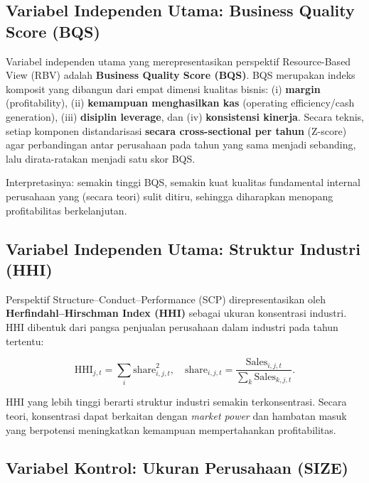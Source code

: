 \documentclass[12pt,a4paper]{report}
\begin{document}
\hypertarget{variabel-independen-utama-business-quality-score-bqs}{%
\subsection{Variabel Independen Utama: Business Quality Score
(BQS)}\label{variabel-independen-utama-business-quality-score-bqs}}

Variabel independen utama yang merepresentasikan perspektif
Resource-Based View (RBV) adalah \textbf{Business Quality Score (BQS)}.
BQS merupakan indeks komposit yang dibangun dari empat dimensi kualitas
bisnis: (i) \textbf{margin} (profitability), (ii) \textbf{kemampuan
menghasilkan kas} (operating efficiency/cash generation), (iii)
\textbf{disiplin leverage}, dan (iv) \textbf{konsistensi kinerja}.
Secara teknis, setiap komponen distandarisasi \textbf{secara
cross-sectional per tahun} (Z-score) agar perbandingan antar perusahaan
pada tahun yang sama menjadi sebanding, lalu dirata-ratakan menjadi satu
skor BQS.

Interpretasinya: semakin tinggi BQS, semakin kuat kualitas fundamental
internal perusahaan yang (secara teori) sulit ditiru, sehingga
diharapkan menopang profitabilitas berkelanjutan.

\hypertarget{variabel-independen-utama-struktur-industri-hhi}{%
\subsection{Variabel Independen Utama: Struktur Industri
(HHI)}\label{variabel-independen-utama-struktur-industri-hhi}}

Perspektif Structure--Conduct--Performance (SCP) direpresentasikan oleh
\textbf{Herfindahl--Hirschman Index (HHI)} sebagai ukuran konsentrasi
industri. HHI dibentuk dari pangsa penjualan perusahaan dalam industri
pada tahun tertentu:

\[
\mathrm{HHI}_{j,t}=\sum_i \mathrm{share}_{i,j,t}^2,\quad
\mathrm{share}_{i,j,t}=\frac{\mathrm{Sales}_{i,j,t}}{\sum_k \mathrm{Sales}_{k,j,t}}.
\]

HHI yang lebih tinggi berarti struktur industri semakin terkonsentrasi.
Secara teori, konsentrasi dapat berkaitan dengan \emph{market power} dan
hambatan masuk yang berpotensi meningkatkan kemampuan mempertahankan
profitabilitas.

\hypertarget{variabel-kontrol-ukuran-perusahaan-size}{%
\subsection{Variabel Kontrol: Ukuran Perusahaan
(SIZE)}\label{variabel-kontrol-ukuran-perusahaan-size}}
\end{document}
